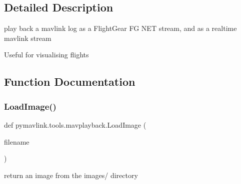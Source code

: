 \subsection{Detailed Description}
\begin{DoxyVerb}play back a mavlink log as a FlightGear FG NET stream, and as a
realtime mavlink stream

Useful for visualising flights
\end{DoxyVerb}
 

\subsection{Function Documentation}
\mbox{\label{namespacepymavlink_1_1tools_1_1mavplayback_a17e3c701be8a8a9874ae66267994781f}} 
\subsubsection{\texorpdfstring{Load\+Image()}{LoadImage()}}
{\footnotesize\ttfamily def pymavlink.\+tools.\+mavplayback.\+Load\+Image (\begin{DoxyParamCaption}\item[{}]{filename }\end{DoxyParamCaption})}

\begin{DoxyVerb}return an image from the images/ directory\end{DoxyVerb}
 
